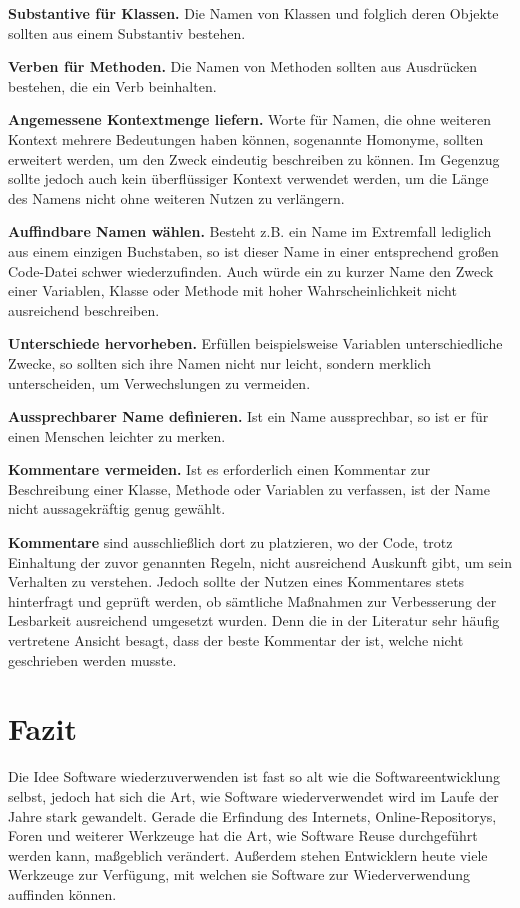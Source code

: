 \documentclass[utf8,biblatex]{lni}
\begin{document}
\textbf{Substantive für Klassen.} Die Namen von Klassen und folglich deren Objekte sollten aus einem Substantiv bestehen.

\textbf{Verben für Methoden.} Die Namen von Methoden sollten aus Ausdrücken bestehen, die ein Verb beinhalten.

\textbf{Angemessene Kontextmenge liefern.} Worte für Namen, die ohne weiteren Kontext mehrere Bedeutungen haben können, sogenannte Homonyme, sollten erweitert werden, um den Zweck eindeutig beschreiben zu können. Im Gegenzug sollte jedoch auch kein überflüssiger Kontext verwendet werden, um die Länge des Namens nicht ohne weiteren Nutzen zu verlängern.

\textbf{Auffindbare Namen wählen.} Besteht z.B. ein Name im Extremfall lediglich aus einem einzigen Buchstaben, so ist dieser Name in einer entsprechend großen Code-Datei schwer wiederzufinden. Auch würde ein zu kurzer Name den Zweck einer Variablen, Klasse oder Methode mit hoher Wahrscheinlichkeit nicht ausreichend beschreiben.

\textbf{Unterschiede hervorheben.} Erfüllen beispielsweise Variablen unterschiedliche Zwecke, so sollten sich ihre Namen nicht nur leicht, sondern merklich unterscheiden, um Verwechslungen zu vermeiden.

\textbf{Aussprechbarer Name definieren.} Ist ein Name aussprechbar, so ist er für einen Menschen leichter zu merken.

\textbf{Kommentare vermeiden.} Ist es erforderlich einen Kommentar zur Beschreibung einer Klasse, Methode oder Variablen zu verfassen, ist der Name nicht aussagekräftig genug gewählt.


\textbf{Kommentare} sind ausschließlich dort zu platzieren, wo der Code, trotz Einhaltung der zuvor genannten Regeln, nicht ausreichend Auskunft gibt, um sein Verhalten zu verstehen. Jedoch sollte der Nutzen eines Kommentares stets hinterfragt und geprüft werden, ob sämtliche Maßnahmen zur Verbesserung der Lesbarkeit ausreichend umgesetzt wurden. Denn die in der Literatur sehr häufig vertretene Ansicht besagt, dass der beste Kommentar der ist, welche nicht geschrieben werden musste.

\section{Fazit}

Die Idee Software wiederzuverwenden ist fast so alt wie die Softwareentwicklung selbst, jedoch hat sich die Art, wie Software wiederverwendet wird im Laufe der Jahre stark gewandelt. Gerade die Erfindung des Internets, Online-Repositorys, Foren und weiterer Werkzeuge hat die Art, wie Software Reuse durchgeführt werden kann, maßgeblich verändert. Außerdem stehen Entwicklern heute viele Werkzeuge zur Verfügung, mit welchen sie Software zur Wiederverwendung auffinden können. 
\end{document}
